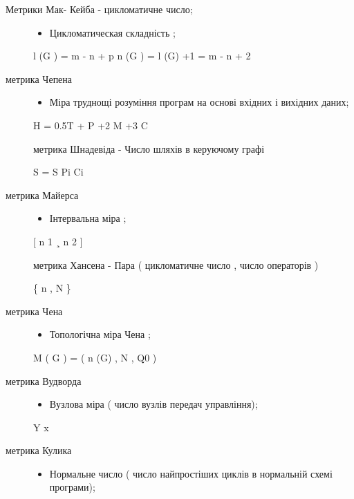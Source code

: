 \documentclass[oneside,final,14pt]{extreport}
\begin{document}
\begin{description}
\item[{Метрики Мак- Кейба - цикломатичне число;}] \leavevmode\begin{itemize}
\item {} 
Цикломатическая складність ;

\end{itemize}

l (G ) = m - n + p
n (G ) = l (G) +1 = m - n + 2

\item[{метрика Чепена}] \leavevmode\begin{itemize}
\item {} 
Міра труднощі розуміння програм на основі вхідних і вихідних даних;

\end{itemize}

H = 0.5T + P +2 M +3 C

метрика Шнадевіда
- Число шляхів в керуючому графі

S = S Pi Ci

\item[{метрика Майерса}] \leavevmode\begin{itemize}
\item {} 
Інтервальна міра ;

\end{itemize}

{[} n 1 ¸ n 2 {]}

метрика Хансена
- Пара ( цикломатичне число , число операторів )

\{ n , N \}

\item[{метрика Чена}] \leavevmode\begin{itemize}
\item {} 
Топологічна міра Чена ;

\end{itemize}

M ( G ) = ( n (G) , N , Q0 )

\item[{метрика Вудворда}] \leavevmode\begin{itemize}
\item {} 
Вузлова міра ( число вузлів передач управління);

\end{itemize}

Y x

\item[{метрика Кулика}] \leavevmode\begin{itemize}
\item {} 
Нормальне число ( число найпростіших циклів в нормальній схемі програми);


\end{itemize}
\end{description}
\end{document}
